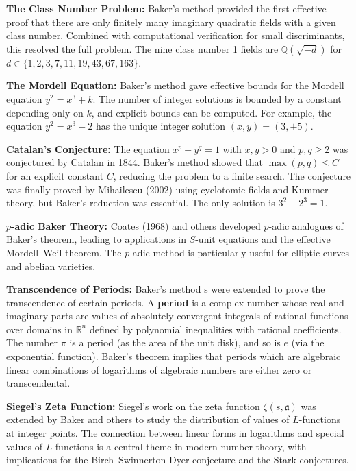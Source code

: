 \textbf{The Class Number Problem:} Baker's method \cite{baker1966} provided the first effective proof that there are only finitely many imaginary quadratic fields with a given class number. Combined with computational verification for small discriminants, this resolved the full problem. The nine class number 1 fields are $\mathbb{Q}(\sqrt{-d})$ for $d \in \{1, 2, 3, 7, 11, 19, 43, 67, 163\}$.

\textbf{The Mordell Equation:} Baker's method \cite{baker1966} gave effective bounds for the Mordell equation $y^2 = x^3 + k$. The number of integer solutions is bounded by a constant depending only on $k$, and explicit bounds can be computed. For example, the equation $y^2 = x^3 - 2$ has the unique integer solution $(x, y) = (3, \pm 5)$.

\textbf{Catalan's Conjecture:} The equation $x^p - y^q = 1$ with $x, y > 0$ and $p, q \geq 2$ was conjectured by Catalan in 1844. Baker's method \cite{baker1966} showed that $\max(p, q) \leq C$ for an explicit constant $C$, reducing the problem to a finite search. The conjecture was finally proved by Mihailescu (2002) using cyclotomic fields and Kummer theory, but Baker's reduction was essential. The only solution is $3^2 - 2^3 = 1$.

\textbf{$p$-adic Baker Theory:} Coates (1968) and others developed $p$-adic analogues of Baker's theorem, leading to applications in $S$-unit equations and the effective Mordell--Weil theorem. The $p$-adic method is particularly useful for elliptic curves and abelian varieties.

\textbf{Transcendence of Periods:} Baker's method \cite{baker1966}s were extended to prove the transcendence of certain periods. A \textbf{period} is a complex number whose real and imaginary parts are values of absolutely convergent integrals of rational functions over domains in $\mathbb{R}^n$ defined by polynomial inequalities with rational coefficients. The number $\pi$ is a period (as the area of the unit disk), and so is $e$ (via the exponential function). Baker's theorem implies that periods which are algebraic linear combinations of logarithms of algebraic numbers are either zero or transcendental.

\textbf{Siegel's Zeta Function:} Siegel's work on the zeta function $\zeta(s, \mathfrak{a})$ was extended by Baker and others to study the distribution of values of $L$-functions at integer points. The connection between linear forms in logarithms and special values of $L$-functions is a central theme in modern number theory, with implications for the Birch--Swinnerton-Dyer conjecture and the Stark conjectures.

